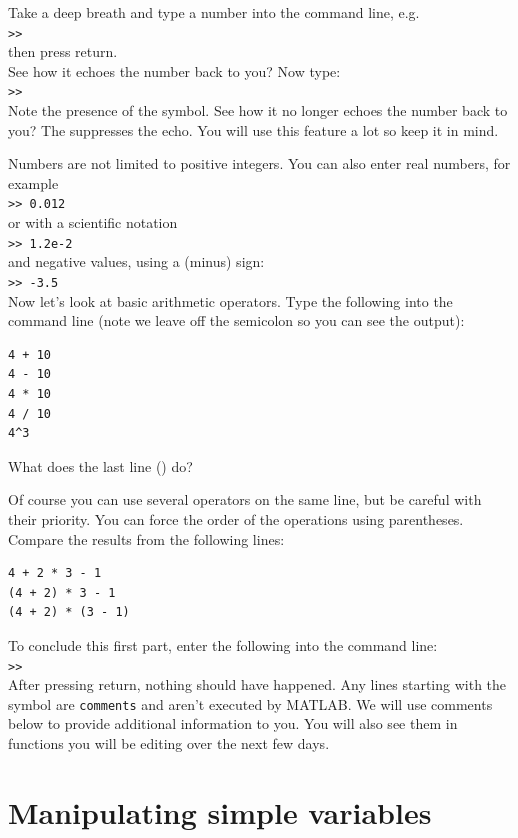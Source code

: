 \documentclass{article}
\begin{document}
Take a deep breath and type a number into the command line, e.g. \\
\verb|>>|  \\
then press return. \\
See how it echoes the number back to you? Now type: \\
\verb|>>|  \\
Note the presence of the \mcode{;} symbol.
See how it no longer echoes the number back to you?
The \mcode{;} suppresses the echo.
You will use this feature a lot so keep it in mind.

Numbers are not limited to positive integers.
You can also enter real numbers, for example \\
\verb|>> 0.012| \\
or with a scientific notation \\
\verb|>> 1.2e-2| \\
and negative values, using a \mcode{-} (minus) sign:\\
\verb|>> -3.5| \\

Now let's look at basic arithmetic operators.
Type the following into the command line (note we leave off the semicolon so you can see the output):
\begin{lstlisting}
4 + 10
4 - 10
4 * 10
4 / 10
4^3
\end{lstlisting}
What does the last line () do?

Of course you can use several operators on the same line, but be careful with their priority.
You can force the order of the operations using parentheses.
Compare the results from the following lines:
\begin{lstlisting}
4 + 2 * 3 - 1
(4 + 2) * 3 - 1
(4 + 2) * (3 - 1)
\end{lstlisting}

To conclude this first part, enter the following into the command line: \\
\verb|>>|  \\
After pressing return, nothing should have happened.
Any lines starting with the \mcode{\%} symbol are \verb|comments| and aren't executed by MATLAB.
We will use comments below to provide additional information to you. You will also see them 
in functions you will be editing over the next few days.


\section{Manipulating simple variables}
\end{document}
